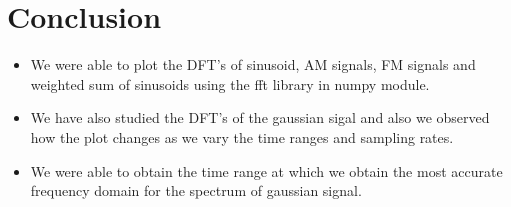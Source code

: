 \documentclass{article}
\begin{document}
\section{Conclusion}
\begin{itemize}
    \item We were able to plot the DFT's of sinusoid, AM signals, FM signals and weighted sum of sinusoids using the fft library in numpy module.
    \item We have also studied the DFT's of the gaussian sigal and also we observed how the plot changes as we vary the time ranges and sampling rates.
    \item We were able to obtain the time range at which we obtain the most accurate frequency domain for the spectrum of gaussian signal.
\end{itemize}
\end{document}
